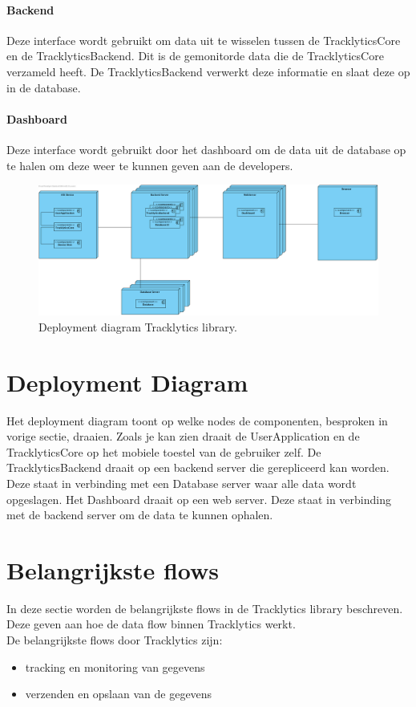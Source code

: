 \paragraph{Backend}
Deze interface wordt gebruikt om data uit te wisselen tussen de TracklyticsCore en de TracklyticsBackend. Dit is de gemonitorde data die de TracklyticsCore verzameld heeft. De TracklyticsBackend verwerkt deze informatie en slaat deze op in de database.\\

\paragraph{Dashboard}
Deze interface wordt gebruikt door het dashboard om de data uit de database op te halen om deze weer te kunnen geven aan de developers. 





\begin{figure}[!h]
  \centering
  \includegraphics[scale=0.30]{Afbeeldingen/Architectuur/Deployment}
  \caption{Deployment diagram Tracklytics library.}
  \label{fig:deployment}
\end{figure}
\section{Deployment Diagram}
Het deployment diagram toont op welke nodes de componenten, besproken in vorige sectie, draaien. Zoals je kan zien draait de UserApplication en de TracklyticsCore op het mobiele toestel van de gebruiker zelf. De TracklyticsBackend draait op een backend server die gerepliceerd kan worden. Deze staat in verbinding met een Database server waar alle data wordt opgeslagen. Het Dashboard draait op een web server. Deze staat in verbinding met de backend server om de data te kunnen ophalen.

\section{Belangrijkste flows}
In deze sectie worden de belangrijkste flows in de Tracklytics library beschreven. Deze geven aan hoe de data flow binnen Tracklytics werkt.\\
De belangrijkste flows door Tracklytics zijn:
\begin{itemize}
\item tracking en monitoring van gegevens
\item verzenden en opslaan van de gegevens
\end{itemize} 


